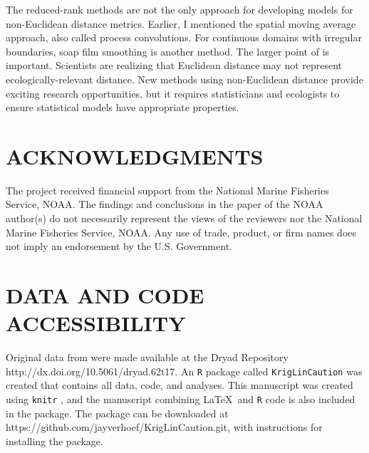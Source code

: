\documentclass[11pt, titlepage]{article}\usepackage[]{graphicx}\usepackage[]{color}
\begin{document}
\begin{spacing}{1.9}
\begin{flushleft}
The reduced-rank methods are not the only approach for developing models for non-Euclidean distance metrics.  Earlier, I mentioned the spatial moving average approach, also called process convolutions.  For continuous domains with irregular boundaries, soap film smoothing \citep{Wood:Brav:Hedl:soap:2008} is another method. The larger point of \citet{Ladl:Avga:Whea:Boyc:pred:2016} is important. Scientists are realizing that Euclidean distance may not represent ecologically-relevant distance.  New methods using non-Euclidean distance provide exciting research opportunities, but it requires statisticians and ecologists to ensure statistical models have appropriate properties. 

\section*{ACKNOWLEDGMENTS} 

The project received financial support from the National Marine Fisheries Service, NOAA. The findings and conclusions in the paper of the NOAA author(s) do not necessarily represent the views of the reviewers nor the National Marine Fisheries Service, NOAA. Any use of trade, product, or firm names does not imply an endorsement by the U.S. Government. 

\section*{DATA AND CODE ACCESSIBILITY}

Original data from \citet{Ladl:Avga:Whea:Boyc:pred:2016} were made available at the Dryad Repository http://dx.doi.org/10.5061/dryad.62t17. An \texttt{R} \citep{R:Deve:Core:ALan:2017} package called \texttt{KrigLinCaution} was created that contains all data, code, and analyses. This manuscript was created using \texttt{knitr} \citep{Yihu:impl:2014,Yihu:dyna:2015,Yihu:knit:2016}, and the manuscript combining \LaTeX\ and \texttt{R} code is also included in the package.  The package can be downloaded at https://github.com/jayverhoef/KrigLinCaution.git, with instructions for installing the package.

	


%
%





\end{flushleft}
\end{spacing}
\end{document}
